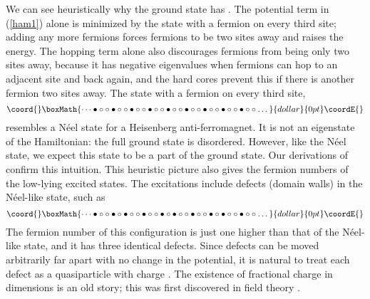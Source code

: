 \documentclass[a4paper,prl,aps,twocolumn]{revtex4}
\begin{document}
We can see heuristically why the ground state has \coordHE{}.  
The potential term in (\ref{ham1}) alone is minimized by the state with  
a fermion on every third site; adding any more fermions forces  
fermions to be two sites away and raises the energy. The hopping term  
alone also discourages fermions from being only two sites away,
because it has negative eigenvalues when fermions can hop to an  
adjacent site and back again, and the hard cores prevent this if there  
is another fermion two sites away. The state with a fermion on every  
third site, 
$$\coord{}\boxMath{\dots 
\bullet\circ\circ
\bullet\circ\circ
\bullet\circ\circ
\bullet\circ\circ
\bullet\circ\circ
\bullet\circ\circ
\bullet\circ\circ
\bullet\circ\circ
\bullet\circ\circ
\dots}{dollar}{0pt}\coordE{}$$ resembles a N\'eel state for a Heisenberg anti-ferromagnet. 
It is not an eigenstate of the Hamiltonian: the
full ground state is disordered. However, like the N\'eel state, we
expect this state to be a part of the ground state. Our derivations
of \coordHE{} confirm this intuition.
This heuristic picture also gives the fermion numbers of the low-lying
excited states.  The excitations include defects (domain walls) in the
N\'eel-like state, such as
$$\coord{}\boxMath{\dots 
\bullet\circ\circ
\bullet\circ
\bullet\circ\circ
\bullet\circ\circ
\bullet\circ
\bullet\circ\circ
\bullet\circ\circ
\bullet\circ
\bullet\circ\circ 
\bullet\circ\circ 
\dots}{dollar}{0pt}\coordE{}$$ The fermion number of this
configuration is just one higher than that of the N\'eel-like state,
and it has three identical defects. Since defects can be moved
arbitrarily far apart with no change in the potential, it is
natural to treat each defect as a quasiparticle with charge \coordHE{}.
The existence of fractional charge in \coordHE{} dimensions is an old
story; this was first discovered in field theory \cite{JRGW}.
\end{document}
